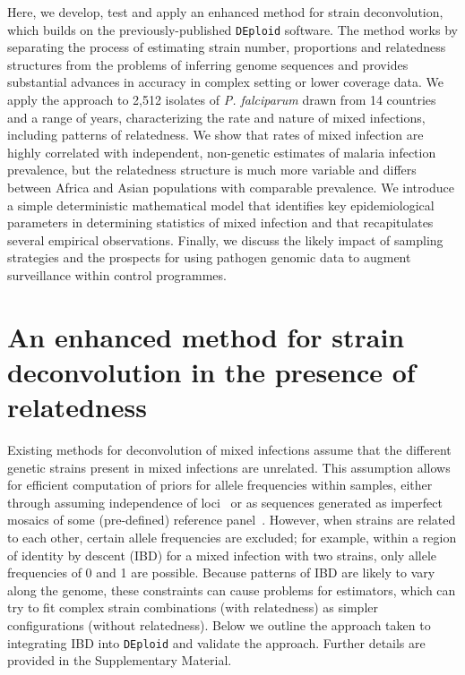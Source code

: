 \documentclass[9pt,lineno]{elife}
\begin{document}
Here, we develop, test and apply an enhanced method for strain deconvolution, which builds on the previously-published \texttt{DEploid} software.  The method works by separating the process of estimating strain number, proportions and relatedness structures from the problems of inferring genome sequences and provides substantial advances in accuracy in complex setting or lower coverage data.  We apply the approach to 2,512 isolates of {\it P. falciparum} drawn from 14 countries and a range of years, characterizing the rate and nature of mixed infections, including patterns of relatedness.  We show that rates of mixed infection are highly correlated with independent, non-genetic estimates of malaria infection prevalence, but the relatedness structure is much more variable and differs between Africa and Asian populations with comparable prevalence.  We introduce a simple deterministic mathematical model that identifies key epidemiological parameters in determining statistics of mixed infection and that recapitulates several empirical observations.  Finally, we discuss the likely impact of sampling strategies and the prospects for using pathogen genomic data to augment surveillance within control programmes.



\section{An enhanced method for strain deconvolution in the presence of relatedness}

Existing methods for deconvolution of mixed infections assume that the different genetic strains present in mixed infections are unrelated.  This assumption allows for efficient computation of priors for allele frequencies within samples, either through assuming independence of loci~\citep{Jack2016} or as sequences generated as imperfect mosaics of some (pre-defined) reference panel~\citep{Zhu2017}.  However, when strains are related to each other, certain allele frequencies are excluded; for example, within a region of identity by descent (IBD) for a mixed infection with two strains, only allele frequencies of 0 and 1 are possible.  Because patterns of IBD are likely to vary along the genome, these constraints can cause problems for estimators, which can try to fit complex strain combinations (with relatedness) as simpler configurations (without relatedness).  Below we outline the approach taken to integrating IBD into \texttt{DEploid} and validate the approach.  Further details are provided in the Supplementary Material.
\end{document}
